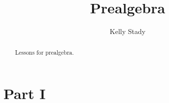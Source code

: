 \documentclass{xourse}
\title{Prealgebra}
\author{Kelly Stady}
\begin{document}
\begin{abstract}
    Lessons for prealgebra.
\end{abstract}
\maketitle

\part{Part I}  %

\end{document}
